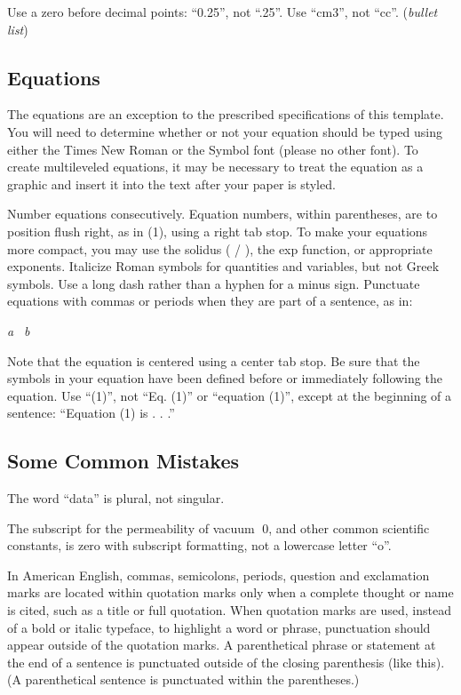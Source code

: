 \documentclass[preprint,12pt,authoryear]{elsarticle}
\begin{document}
Use a zero before decimal points: “0.25”, not “.25”. Use “cm3”, not “cc”. (\textit{bullet list})

\subsection{Equations}

The equations are an exception to the prescribed specifications of this template. You will need to determine whether or not your equation should be typed using either the Times New Roman or the Symbol font (please no other font). To create multileveled equations, it may be necessary to treat the equation as a graphic and insert it into the text after your paper is styled.

Number equations consecutively. Equation numbers, within parentheses, are to position flush right, as in (1), using a right tab stop. To make your equations more compact, you may use the solidus ( / ), the exp function, or appropriate exponents. Italicize Roman symbols for quantities and variables, but not Greek symbols. Use a long dash rather than a hyphen for a minus sign. Punctuate equations with commas or periods when they are part of a sentence, as in:

	\textit{a}\textit{b}	

Note that the equation is centered using a center tab stop. Be sure that the symbols in your equation have been defined before or immediately following the equation. Use “(1)”, not “Eq. (1)” or “equation (1)”, except at the beginning of a sentence: “Equation (1) is . . .”

\subsection{Some Common Mistakes}

The word “data” is plural, not singular.

The subscript for the permeability of vacuum \textit{}0, and other common scientific constants, is zero with subscript formatting, not a lowercase letter “o”.

In American English, commas, semicolons, periods, question and exclamation marks are located within quotation marks only when a complete thought or name is cited, such as a title or full quotation. When quotation marks are used, instead of a bold or italic typeface, to highlight a word or phrase, punctuation should appear outside of the quotation marks. A parenthetical phrase or statement at the end of a sentence is punctuated outside of the closing parenthesis (like this). (A parenthetical sentence is punctuated within the parentheses.)
\end{document}
